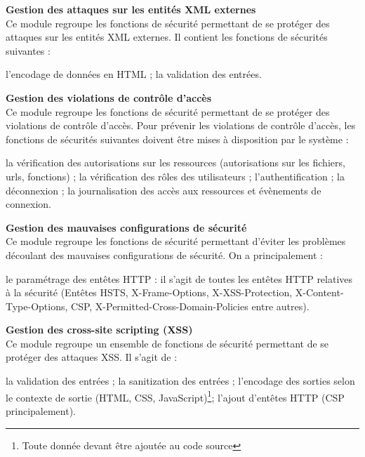 \textbf{\RIGHTarrow Gestion des attaques sur les entités XML externes}\\
Ce module regroupe les fonctions de sécurité permettant de se protéger des attaques sur les entités XML externes. Il contient les fonctions de sécurités suivantes :
\begin{itemize}
	\itemcheck l'encodage de données en HTML ;
	\itemcheck la validation des entrées.\\
\end{itemize}

\textbf{\RIGHTarrow Gestion des violations de contrôle d’accès}\\
Ce module regroupe les fonctions de sécurité permettant de se protéger des violations de contrôle d'accès. Pour prévenir les violations de contrôle d'accès, les fonctions de sécurités suivantes doivent être mises à disposition par le système :
\begin{itemize}
	\itemcheck la vérification des autorisations sur les ressources (autorisations sur les fichiers, urls, fonctions) ; 
	\itemcheck la vérification des rôles des utilisateurs ; 
	\itemcheck l'authentification ; 
	\itemcheck la déconnexion ; 
	\itemcheck la journalisation des accès aux ressources et évènements de connexion.\\
\end{itemize}

\textbf{\RIGHTarrow Gestion des mauvaises configurations de sécurité}\\
Ce module regroupe les fonctions de sécurité permettant d'éviter les problèmes découlant des mauvaises configurations de sécurité. On a principalement :
\begin{itemize}
	\itemcheck le paramétrage des entêtes HTTP : il s'agit de toutes les entêtes HTTP relatives à la sécurité (Entêtes HSTS, X-Frame-Options, X-XSS-Protection, X-Content-Type-Options, CSP, X-Permitted-Cross-Domain-Policies entre autres). \\
\end{itemize}

\textbf{\RIGHTarrow Gestion des cross-site scripting (XSS)}\\
Ce module regroupe un ensemble de fonctions de sécurité permettant de se protéger des attaques XSS. Il s'agit de :
\begin{itemize}
	\itemcheck la validation des entrées ;
	\itemcheck la sanitization des entrées ;
	\itemcheck l'encodage des sorties selon le contexte de sortie (HTML, CSS, JavaScript)\footnote{Toute donnée devant être ajoutée au code source};
	\itemcheck l'ajout d'entêtes HTTP (CSP principalement).\\
\end{itemize}


